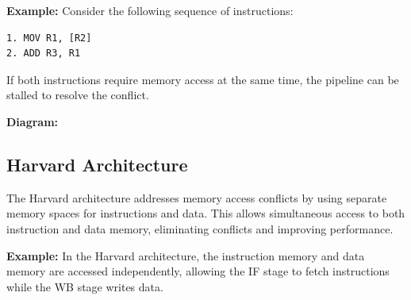 \documentclass{report}
\begin{document}
\textbf{Example:}
Consider the following sequence of instructions:
\begin{verbatim}
1. MOV R1, [R2]
2. ADD R3, R1
\end{verbatim}

If both instructions require memory access at the same time, the pipeline can be stalled to resolve the conflict.

\textbf{Diagram:}
\begin{center}
\end{center}

\subsection{Harvard Architecture}

The Harvard architecture addresses memory access conflicts by using separate memory spaces for instructions and data. This allows simultaneous access to both instruction and data memory, eliminating conflicts and improving performance.

\textbf{Example:}
In the Harvard architecture, the instruction memory and data memory are accessed independently, allowing the IF stage to fetch instructions while the WB stage writes data.
\end{document}
